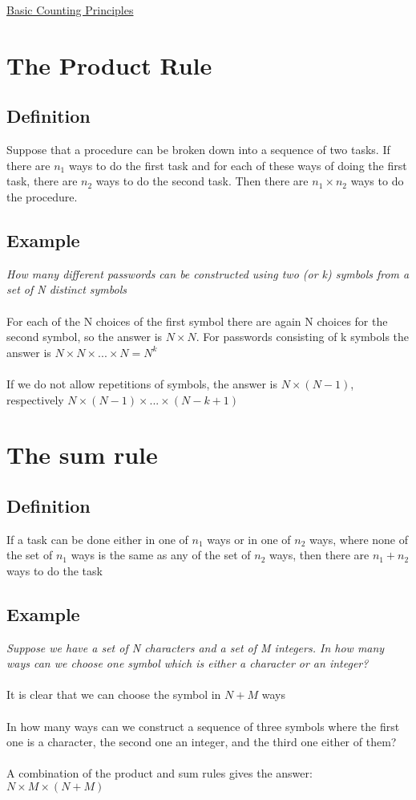 \documentclass{article}[18pt]
\begin{document}
\begin{center}
\underline{\huge Basic Counting Principles}
\end{center}
\section{The Product Rule}
\subsection{Definition}
Suppose that a procedure can be broken down into a sequence of two tasks. If there are $n_1$ ways to do the first task and for each of these ways of doing the first task, there are $n_2$ ways to do the second task. Then there are $n_1\times n_2$ ways to do the procedure.
\subsection{Example}
\textit{How many different passwords can be constructed using two (or k) symbols from a set of N distinct symbols}\\
\\
For each of the N choices of the first symbol there are again N choices for the second symbol, so the answer is $N\times N$. For passwords consisting of k symbols the answer is $N\times N\times ...\times N=N^k$\\
\\
If we do not allow repetitions of symbols, the answer is $N\times(N-1)$, respectively $N\times (N-1)\times ...\times (N-k+1)$
\section{The sum rule}
\subsection{Definition}
If a task can be done either in one of $n_1$ ways or in one of $n_2$ ways, where none of the set of $n_1$ ways is the same as any of the set of $n_2$ ways, then there are $n_1+n_2$ ways to do the task
\subsection{Example}
\textit{Suppose we have a set of N characters and a set of M integers. In how many ways can we choose one symbol which is either a character or an integer?}\\
\\
It is clear that we can choose the symbol in $N+M$ ways\\
\\
In how many ways can we construct a sequence of three symbols where the first one is a character, the second one an integer, and the third one either of them?\\
\\
A combination of the product and sum rules gives the answer: $N\times M\times (N+M)$
\end{document}
